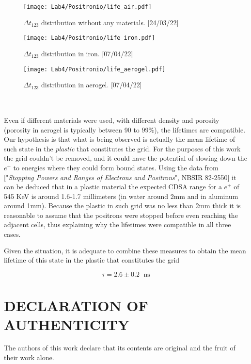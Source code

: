 \documentclass[10pt,a4paper,twocolumn]{article}
\begin{document}
\begin{figure}[h!]
\centering
\texttt{[image: Lab4/Positronio/life\_air.pdf]} 
\caption{$\Delta t_{123}$ distribution without any materials. [24/03/22]}
\label{fig:t123Tempty}
\end{figure}


\begin{figure}[h!]
\centering
\texttt{[image: Lab4/Positronio/life\_iron.pdf]} 
\caption{$\Delta t_{123}$ distribution in iron. [07/04/22]}
\label{fig:t123Tiron}
\end{figure}


\begin{figure}[h!]
\centering
\texttt{[image: Lab4/Positronio/life\_aerogel.pdf]} 
\caption{$\Delta t_{123}$ distribution in aerogel. [07/04/22]}
\label{fig:t123Taero}
\end{figure}


\\
\\
Even if different materials were used, with different density and porosity (porosity in aerogel is typically between 90 to 99\%), the lifetimes are compatible. Our hypothesis is that what is being observed is actually the mean lifetime of such state in the \textit{plastic} that constitutes the grid. For the purposes of this work the grid couldn't be removed, and it could have the potential of slowing down the $e^+$ to energies where they could form bound states. Using the data from ["\textit{Stopping Powers and Ranges of Electrons and Positrons}", NBSIR 82-2550] it can be deduced that in a plastic material the expected CDSA range for a $e^+$ of 545 KeV is around 1.6-1.7 millimeters (in water around 2mm and in aluminum around 1mm). Because the plastic in such grid was no less than 2mm thick it is reasonable to assume that the positrons were stopped before even reaching the adjacent cells, thus explaining why the lifetimes were compatible in all three cases. 

Given the situation, it is adequate to combine these measures to obtain the mean lifetime of this state in the plastic that constitutes the grid

\begin{equation}
    \tau= 2.6 \pm  0.2 \; \text{ ns}
\end{equation}





\section*{DECLARATION OF AUTHENTICITY}
The authors of this work declare that its contents are original and the fruit of their work alone.
\end{document}
